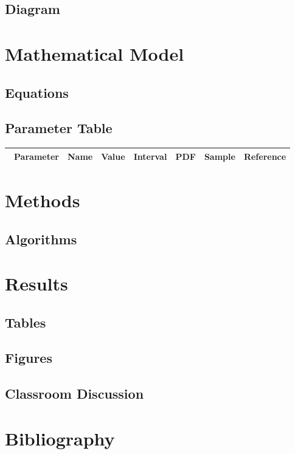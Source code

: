 \subsection{Diagram}

\section{Mathematical Model}

\subsection{Equations}

\subsection{Parameter Table}

\begin{table}[H]\centering
\begin{tabular}{p{1cm}p{1cm}p{1cm}p{1cm}p{1cm}p{1cm}p{4cm}}\
Parameter & Name & Value & Interval & PDF & Sample & Reference \\
\hline
\hline
\end{tabular}
\end{table}

\section{Methods}

\subsection{Algorithms}

\section{Results}

\subsection{Tables}

\subsection{Figures}

\subsection{Classroom Discussion}

\section{Bibliography}


\begin{thebibliography}{00}

\end{thebibliography}


